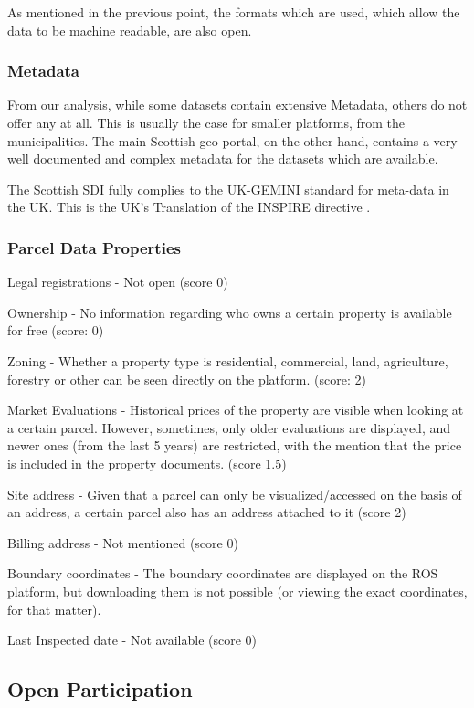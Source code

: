 As mentioned in the previous point, the formats which are used, which allow the data to be machine readable, are also open. 

\subsubsection{Metadata}

From our analysis, while some datasets contain extensive Metadata, others do not offer any at all. This is usually the case for smaller platforms, from the municipalities. The main Scottish geo-portal, on the other hand, contains a very well documented and complex metadata for the datasets which are available. 

The Scottish SDI fully complies to the UK-GEMINI standard for meta-data in the UK. This is the UK's Translation of the INSPIRE directive \citep{ssdi_documentation}. 

\subsubsection{Parcel Data Properties} 

Legal registrations - Not open (score 0)

Ownership - No information regarding who owns a certain property is available for free (score: 0)

Zoning - Whether a property type is residential, commercial, land, agriculture, forestry or other can be seen directly on the platform. (score: 2)

Market Evaluations - Historical prices of the property are visible when looking at a certain parcel. However, sometimes, only older evaluations are displayed, and newer ones (from the last 5 years) are restricted, with the mention that the price is included in the property documents. (score 1.5)

Site address - Given that a parcel can only be visualized/accessed on the basis of an address, a certain parcel also has an address attached to it (score 2)

Billing address - Not mentioned (score 0)

Boundary coordinates - The boundary coordinates are displayed on the ROS platform, but downloading them is not possible (or viewing the exact coordinates, for that matter). 

Last Inspected date - Not available (score 0)

\subsection{Open Participation} %

